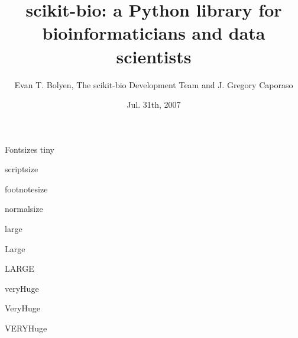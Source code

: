 \documentclass[final]{beamer}
\title{scikit-bio: a Python library for bioinformaticians and data scientists}
\author{Evan T. Bolyen, The scikit-bio Development Team and J. Gregory Caporaso}
\institute{Center for Microbial Genetics and Genomics, Northern Arizona University}
\date{Jul. 31th, 2007}
\begin{document}
  \begin{frame}{}
    \vfill
    \begin{block}{\large Fontsizes}
      \centering
      {\tiny tiny}\par
      {\scriptsize scriptsize}\par
      {\footnotesize footnotesize}\par
      {\normalsize normalsize}\par
      {\large large}\par
      {\Large Large}\par
      {\LARGE LARGE}\par
      {\veryHuge veryHuge}\par
      {\VeryHuge VeryHuge}\par
      {\VERYHuge VERYHuge}\par
    \end{block}
    \vfill
  \end{frame}
  
\end{document}
